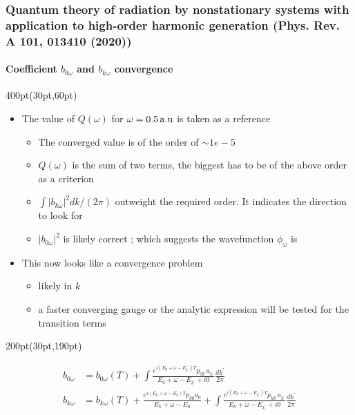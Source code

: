\begin{frame}
\frametitle{Quantum theory of radiation by nonstationary systems 
        with application to high-order harmonic generation
        (Phys. Rev. A 101, 013410 (2020))}
        \framesubtitle{Coefficient $b_{0\omega}$ and $b_{k\omega}$ convergence}

\begin{textblock*}{400pt}(30pt,60pt)
\small

\begin{itemize}
\footnotesize
\item The value of $Q(\omega)$ for $\omega=0.5\,\rm a.u$
is taken as a reference
\begin{itemize}
\footnotesize
\item[$\bullet$] The converged value is of the order of $\sim 1e-5$
\item[$\bullet$] $Q(\omega)$ is the sum of two terms, the biggest 
has to be of the above order as a criterion 
\item[$\bullet$] $\int |b_{k{\omega}}|^2dk/(2\pi)$ outweight the required 
order. It indicates the direction to look for
\item[$\bullet$] $|b_{0{\omega}}|^2$ is likely correct ;
which suggests the wavefunction $\phi_\omega$ is  
\end{itemize}
\item This now looks like a convergence problem
\begin{itemize}
\footnotesize
\item[$\bullet$] likely in $k$
\item[$\bullet$] a faster converging gauge 
or the analytic expression will be tested for the transition terms 
\end{itemize}
\end{itemize}
\end{textblock*}



\begin{textblock*}{200pt}(30pt,190pt)
\footnotesize

\begin{align}
b_{0\omega} & = b_{0\omega}(T)
 +\int\frac{e^{i(E_0+\omega-E_{k^\prime})T}p_{0k^\prime}a_{k^\prime}}
{E_0+\omega-E_{k^\prime} + i0} \frac{dk^\prime}{2\pi} \nonumber\\
b_{k\omega} & = b_{k\omega}(T)
 +\frac{e^{i(E_k+\omega-E_0)T}p_{k0}a_0}{E_k+\omega-E_0}
 +\int\frac{e^{i(E_k+\omega-E_{k^\prime})T}p_{kk^\prime}a_{k^\prime}}
{E_k+\omega-E_{k^\prime} + i0} \frac{dk^\prime}{2\pi} \nonumber
\end{align}


\end{textblock*}
\end{frame}
